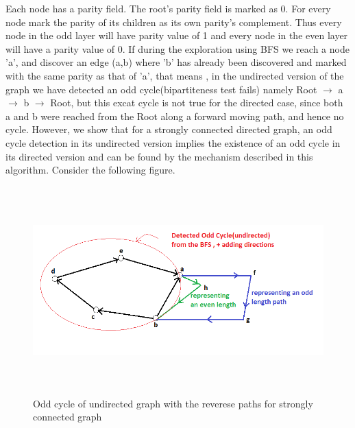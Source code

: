 \documentclass{article}
\begin{document}
  Each node has a parity field. The root's parity field is marked as 0. For every node mark the parity of its children as its own parity's complement. Thus every node in the odd layer will have parity value of 1 and every node in the even layer will have a parity value of 0. If during the exploration using BFS we reach a node 'a', and discover an edge (a,b) where 'b' has already been discovered and marked with the same parity as that of 'a', that means , in the undirected version of the graph we have detected an odd cycle(bipartiteness test fails) namely Root $\rightarrow$ a $\rightarrow$ b $\rightarrow$ Root, but this excat cycle is not true for the directed case, since both a and b were reached from the Root along a forward moving path, and hence no cycle. However, we show that for a strongly connected directed graph, an odd cycle detection in its undirected version implies the existence of an odd cycle in its directed version and can be found by the mechanism described in this algorithm. Consider the following figure. \newline
  \begin{figure}[h!]
   \centering
  \includegraphics[width=15cm, height=8cm]{Prob4c_odd}
  \caption{Odd cycle of undirected graph with the reverese paths for strongly connected graph}
  \end{figure}
\end{document}

